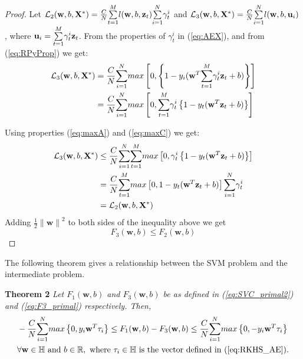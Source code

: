 \documentclass[twoside]{article}
\begin{document}
\begin{proof}
Let ${\cal L}_2({\bf w},b,{\bf X}^*) = \frac{C}{N}\overset{M}{\underset{t = 1}\sum}l(\mathbf{w},b,{\bf z}_t)\overset{N}{\underset{i = 1}\sum} \gamma^i _t$ and ${\cal L}_3({\bf w},b,{\bf X}^*) = \frac{C}{N}\overset{N}{\underset{i = 1}\sum}l(\mathbf{w},b,{\bf u}_i)$, where ${\bf u}_i = \overset{M}{\underset{t = 1}\sum} \gamma^i _t {\bf z}_t$. From the properties of $\gamma^i _t$ in (\ref{eq:AEX}), and from (\ref{eq:RPyProp}) we get:
\begin{align}
{\cal L}_3({\bf w},b,{\bf X}^*) &= \frac{C}{N}\overset{N}{\underset{i = 1}{\sum}}  max\left[0, \left\{1- y_{i}(\mathbf{w}^T { \overset{M}{\underset{t = 1}\sum} \gamma^i _t {\bf z}_t} + b)\right\}\right] \label{eq:L3_def}\\
&=\frac{C}{N} \overset{N}{\underset{i = 1}{\sum}} max\left[0, \overset{M}{\underset{t = 1}\sum} \gamma^i _t\left\{1- y_{t}(\mathbf{w}^T {{\bf z}_t} + b)\right\}\right]\nonumber
\end{align}

Using properties (\ref{eq:maxA}) and (\ref{eq:maxC}) we get:
\begin{align}
{\cal L}_3({\bf w},b,{\bf X}^*) &\le \frac{C}{N}\overset{N}{\underset{i = 1}{\sum}} \overset{M}{\underset{t = 1}\sum} max\left[0, \gamma^i _t \left\{1- y_{t}(\mathbf{w}^T {{\bf z}_t} + b)\right\}\right] \nonumber\\
&= \frac{C}{N} \overset{M}{\underset{t = 1}\sum} max\left[0, 1- y_{t}(\mathbf{w}^T {{\bf z}_t} + b)\right] \overset{N}{\underset{i = 1}{\sum}}\gamma^i _t \nonumber\\
&= {\cal L}_2({\bf w},b,{\bf X}^*) \nonumber
\end{align}
Adding $\frac{1}{2}{\|{\mathbf{w}}\|}^{2}$ to both sides of the inequality above we get
\begin{equation*}
F_3 (\mathbf{w}, b) \le F_2 (\mathbf{w}, b)
\end{equation*}
\end{proof}

\noindent
The following theorem gives a relationship between the SVM problem and the intermediate problem.

\noindent
{\bf Theorem 2} {\it Let $F_1 (\mathbf{w}, b)$ and $F_3 (\mathbf{w}, b)$ be as defined in (\ref{eq:SVC_primal2}) and (\ref{eq:F3_primal}) respectively. Then,
\begin{align*}
&-\frac{C}{N}\overset{N}{\underset{i = 1}{\sum}}max\left\{0, y_{i}\mathbf{w}^T \tau_i\right\} \le F_1 (\mathbf{w}, b) - F_3 (\mathbf{w}, b) \le \frac{C}{N}\overset{N}{\underset{i = 1}{\sum}}max\left\{0, -y_{i}\mathbf{w}^T \tau_i\right\}\\
&\forall {\bf w} \in \mathbb{H} \text{ and } b \in \mathbb{R}, \text{ where } \tau_i \in \mathbb{H} \text{ is the vector defined in (\ref{eq:RKHS_AE}).}
\end{align*}
}
\end{document}
